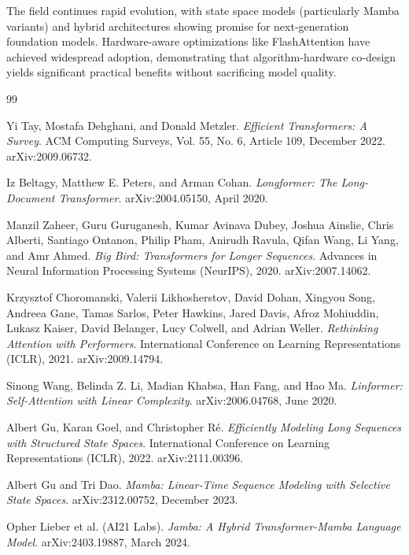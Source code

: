 \documentclass[11pt]{article}
\begin{document}
The field continues rapid evolution, with state space models (particularly Mamba variants) and hybrid architectures showing promise for next-generation foundation models. Hardware-aware optimizations like FlashAttention have achieved widespread adoption, demonstrating that algorithm-hardware co-design yields significant practical benefits without sacrificing model quality.

\begin{thebibliography}{99}

Yi Tay, Mostafa Dehghani, and Donald Metzler.
\textit{Efficient Transformers: A Survey}.
ACM Computing Surveys, Vol. 55, No. 6, Article 109, December 2022.
arXiv:2009.06732.

Iz Beltagy, Matthew E. Peters, and Arman Cohan.
\textit{Longformer: The Long-Document Transformer}.
arXiv:2004.05150, April 2020.

Manzil Zaheer, Guru Guruganesh, Kumar Avinava Dubey, Joshua Ainslie, Chris Alberti, Santiago Ontanon, Philip Pham, Anirudh Ravula, Qifan Wang, Li Yang, and Amr Ahmed.
\textit{Big Bird: Transformers for Longer Sequences}.
Advances in Neural Information Processing Systems (NeurIPS), 2020.
arXiv:2007.14062.

Krzysztof Choromanski, Valerii Likhosherstov, David Dohan, Xingyou Song, Andreea Gane, Tamas Sarlos, Peter Hawkins, Jared Davis, Afroz Mohiuddin, Lukasz Kaiser, David Belanger, Lucy Colwell, and Adrian Weller.
\textit{Rethinking Attention with Performers}.
International Conference on Learning Representations (ICLR), 2021.
arXiv:2009.14794.

Sinong Wang, Belinda Z. Li, Madian Khabsa, Han Fang, and Hao Ma.
\textit{Linformer: Self-Attention with Linear Complexity}.
arXiv:2006.04768, June 2020.

Albert Gu, Karan Goel, and Christopher R\'e.
\textit{Efficiently Modeling Long Sequences with Structured State Spaces}.
International Conference on Learning Representations (ICLR), 2022.
arXiv:2111.00396.

Albert Gu and Tri Dao.
\textit{Mamba: Linear-Time Sequence Modeling with Selective State Spaces}.
arXiv:2312.00752, December 2023.

Opher Lieber et al. (AI21 Labs).
\textit{Jamba: A Hybrid Transformer-Mamba Language Model}.
arXiv:2403.19887, March 2024.


\end{thebibliography}
\end{document}
